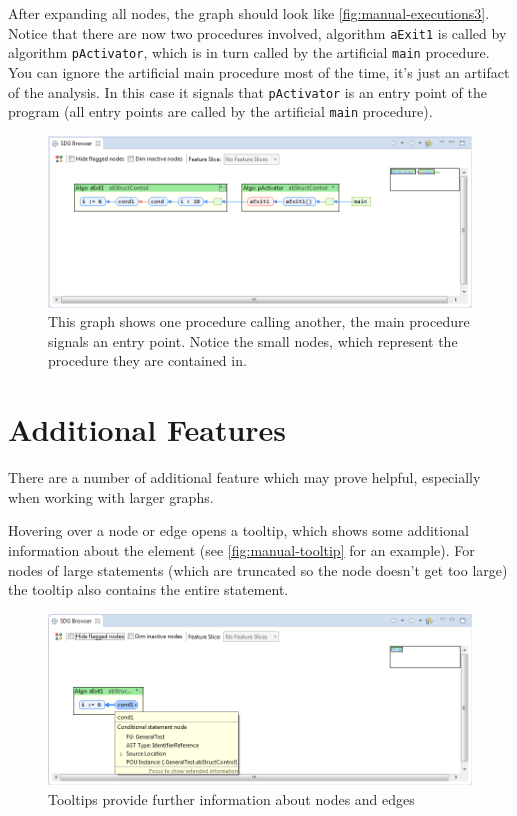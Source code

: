 After expanding all nodes, the graph should look like \autoref{fig:manual-executions3}. Notice that there are now two 
procedures involved, algorithm \lstinline|aExit1| is called by algorithm \lstinline|pActivator|, which is in turn 
called by the artificial \lstinline|main| procedure. You can ignore the artificial main procedure most of the time, 
it's just an artifact of the analysis. In this case it signals that \lstinline|pActivator| is an entry point of the 
program (all entry points are called by the artificial \lstinline|main| procedure).

\begin{figure}[hp]
  \centering
    \includegraphics[width=\textwidth]{bilder/manual-executions3}
  \caption[Graph showing a procedure call and an entry point]
    {This graph shows one procedure calling another, the main procedure signals an entry point. Notice the small nodes, 
    which represent the procedure they are contained in.}
  \label{fig:manual-executions3}
\end{figure}


\section{Additional Features} \label{sec:manual-features}

There are a number of additional feature which may prove helpful, especially when working with larger graphs.

Hovering over a node or edge opens a tooltip, which shows some additional information about the element (see 
\autoref{fig:manual-tooltip} for an example). For nodes of large statements (which are truncated so the node doesn't 
get too large) the tooltip also contains the entire statement.

\begin{figure}[hp]
  \centering
    \includegraphics[width=\textwidth]{bilder/manual-tooltip}
  \caption{Tooltips provide further information about nodes and edges}
  \label{fig:manual-tooltip}
\end{figure}


